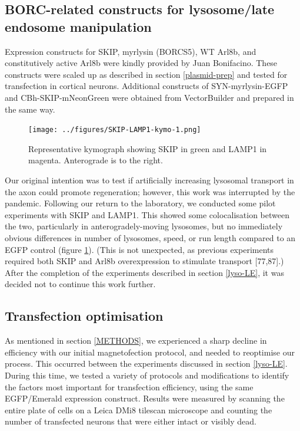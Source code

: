 \documentclass[
  12pt,
  a4paper,
]{book}
\begin{document}
\hypertarget{borc-related-constructs-for-lysosomelate-endosome-manipulation}{%
\subsection{BORC-related constructs for lysosome/late endosome manipulation}\label{borc-related-constructs-for-lysosomelate-endosome-manipulation}}

Expression constructs for SKIP, myrlysin (BORCS5), WT Arl8b, and constitutively active Arl8b were kindly provided by Juan Bonifacino. These constructs were scaled up as described in section \ref{plasmid-prep} and tested for transfection in cortical neurons. Additional constructs of SYN-myrlysin-EGFP and CBh-SKIP-mNeonGreen were obtained from VectorBuilder and prepared in the same way.

\begin{figure}
\centering
\texttt{[image: ../figures/SKIP-LAMP1-kymo-1.png]}
\caption{\label{fig:SKIP-LAMP1-kymo}Representative kymograph showing SKIP in green and LAMP1 in magenta. Anterograde is to the right.}
\end{figure}

Our original intention was to test if artificially increasing lysosomal transport in the axon could promote regeneration; however, this work was interrupted by the pandemic. Following our return to the laboratory, we conducted some pilot experiments with SKIP and LAMP1. This showed some colocalisation between the two, particularly in anterogradely-moving lysosomes, but no immediately obvious differences in number of lysosomes, speed, or run length compared to an EGFP control (figure \ref{fig:SKIP-LAMP1-kymo}). (This is not unexpected, as previous experiments required both SKIP and Arl8b overexpression to stimulate transport {[}77,87{]}.) After the completion of the experiments described in section \ref{lyso-LE}, it was decided not to continue this work further.

\hypertarget{transfection-optimisation}{%
\subsection{Transfection optimisation}\label{transfection-optimisation}}

As mentioned in section \ref{METHODS}, we experienced a sharp decline in efficiency with our initial magnetofection protocol, and needed to reoptimise our process. This occurred between the experiments discussed in section \ref{lyso-LE}. During this time, we tested a variety of protocols and modifications to identify the factors most important for transfection efficiency, using the same EGFP/Emerald expression construct. Results were measured by scanning the entire plate of cells on a Leica DMi8 tilescan microscope and counting the number of transfected neurons that were either intact or visibly dead.
\end{document}
